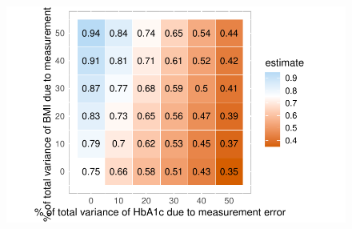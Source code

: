 \documentclass[
  letterpaper,
  DIV=11,
  numbers=noendperiod]{scrartcl}
\begin{document}
\begin{figure}[H]

{\centering \includegraphics{Running_a_Simulation_Study_files/figure-pdf/unnamed-chunk-5-1.pdf}

}

\end{figure}
\end{document}
